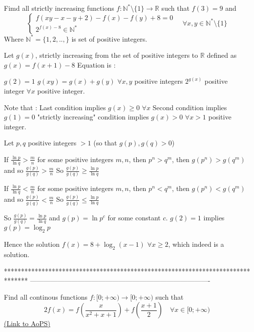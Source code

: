 \begin{solution}
	\begin{tcolorbox}Fimd all strictly increasing  functions $f: \mathbb{N^*} \setminus \{1 \} \to \mathbb{R}$ such that $f(3)=9$ and 
\[\left\{\begin{matrix}f(xy-x-y+2)-f(x)-f(y)+8=0 \\ 2^{f(x)-8} \in \mathbb{N^*} \end{matrix}\right.\quad \forall x,y \in \mathbb{N^*} \setminus \{1 \}\]
Where $ \mathbb{N^*} =\{1,2,..,\}$ is set of positive integers.\end{tcolorbox}
Let $g(x)$, strictly increasing from the set of positive integers to $\mathbb R$ defined as $g(x)=f(x+1)-8$
Equation is :

$g(2)=1$
$g(xy)=g(x)+g(y)$ $\forall x,y$ positive integers
$2^{g(x)}$ positive integer $\forall x$ positive integer.

Note that :
Last condition implies $g(x)\ge 0$ $\forall x$
Second condition implies $g(1)=0$
"strictly increasing" condition implies $g(x)>0$ $\forall x>1$ positive integer.

Let $p,q$ positive integers $>1$ (so that $g(p), g(q)>0$)

If $\frac {\ln p}{\ln q}>\frac mn$ for some positive integers $m,n$, then $p^n>q^m$, then $g(p^n)>g(q^m)$ and so $\frac {g(p)}{g(q)}>\frac mn$
So $\frac {g(p)}{g(q)}\ge\frac {\ln p}{\ln q}$

If $\frac {\ln p}{\ln q}<\frac mn$ for some positive integers $m,n$, then $p^n<q^m$, then $g(p^n)<g(q^m)$ and so $\frac {g(p)}{g(q)}<\frac mn$
So $\frac {g(p)}{g(q)}\le\frac {\ln p}{\ln q}$

So $\frac {g(p)}{g(q)}=\frac {\ln p}{\ln q}$ and $g(p)=\ln p^c$ for some constant $c$.
$g(2)=1$ implies $g(p)=\log_2 p$

Hence the solution $\boxed{f(x)=8+\log_2(x-1)}$ $\forall x\ge 2$, which indeed is a solution.
\end{solution}
*******************************************************************************
-------------------------------------------------------------------------------

\begin{problem}
	Find all continous functions $f:[0;+\infty )\to [0;+\infty )$ such that
\[2f(x)=f(\frac{x}{x^{2}+x+1})+f(\frac{x+1}{2})\quad\forall x\in [0;+\infty )\]
	\flushright \href{https://artofproblemsolving.com/community/c6h568796}{(Link to AoPS)}
\end{problem}



